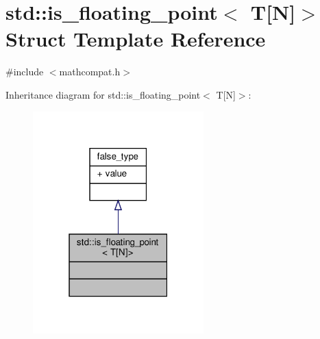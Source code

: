 \hypertarget{structstd_1_1is__floating__point_3_01T[N]_4}{}\section{std\+:\+:is\+\_\+floating\+\_\+point$<$ T\mbox{[}N\mbox{]}$>$ Struct Template Reference}
\label{structstd_1_1is__floating__point_3_01T[N]_4}


{\ttfamily \#include $<$mathcompat.\+h$>$}



Inheritance diagram for std\+:\+:is\+\_\+floating\+\_\+point$<$ T\mbox{[}N\mbox{]}$>$\+:\nopagebreak
\begin{figure}[H]
\begin{center}
\leavevmode
\includegraphics[width=187pt]{da/dec/structstd_1_1is__floating__point_3_01T[N]_4__inherit__graph}
\end{center}
\end{figure}


